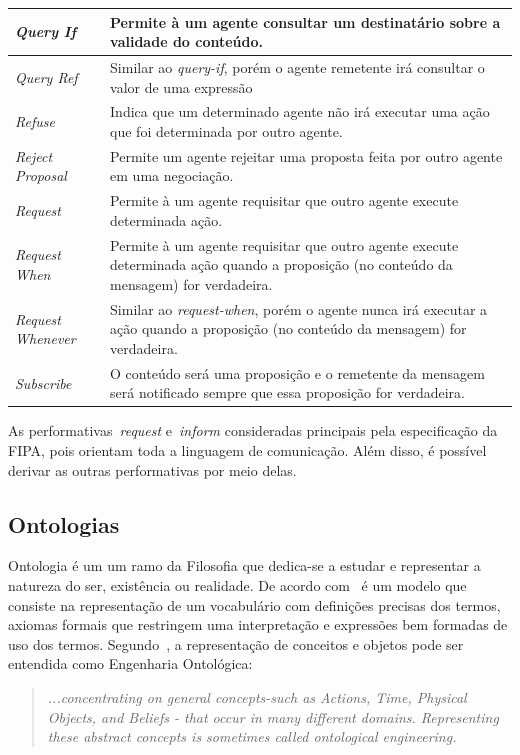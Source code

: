 \begin{table}
\begin{tabular}{|p{3cm} | p{12cm} |}
		\hline
		\emph{Query If} & Permite à um agente consultar um destinatário sobre a validade do conteúdo.	\\
		\hline
		\emph{Query Ref} & Similar ao \emph{query-if}, porém o agente remetente irá consultar o valor de uma expressão	\\
		\hline
		\emph{Refuse} & Indica que um determinado agente não irá executar uma ação que foi determinada por outro agente.	\\
		\hline
		\emph{Reject Proposal} & Permite um agente rejeitar uma proposta feita por outro agente em uma negociação.	\\
		\hline
		\emph{Request} & Permite à um agente requisitar que outro agente execute determinada ação.	\\
		\hline
		\emph{Request When} & Permite à um agente requisitar que outro agente execute determinada ação quando a proposição (no conteúdo da mensagem) for verdadeira.	\\
		\hline
		\emph{Request Whenever} & Similar ao \emph{request-when}, porém o agente nunca irá executar a ação quando a proposição (no conteúdo da mensagem) for verdadeira.	\\
		\hline
		\emph{Subscribe} & O conteúdo será uma proposição e o remetente da mensagem será notificado sempre que essa proposição for verdadeira.	\\
		\hline
	\end{tabular}
	\label{table:fipa-cal-spec}
\end{table}

As performativas~\emph{request} e~\emph{inform} consideradas principais pela especificação da FIPA, pois orientam toda a linguagem de comunicação. Além disso, é possível derivar as outras performativas por meio delas.


\subsection{Ontologias}

Ontologia é um um ramo da Filosofia que dedica-se a estudar e representar a natureza do ser, existência ou realidade. De acordo com~\cite{kim2006towards} é um modelo que consiste na representação de um vocabulário com definições precisas dos termos, axiomas formais que restringem uma interpretação e expressões bem formadas de uso dos termos. Segundo~\cite{novig95}, a representação de conceitos e objetos pode ser entendida como Engenharia Ontológica:

\begin{quote}
\emph{...concentrating on general concepts-such as Actions, Time, Physical Objects, and Beliefs - that occur in many different domains. Representing these abstract concepts is sometimes called ontological engineering.}
\end{quote}

